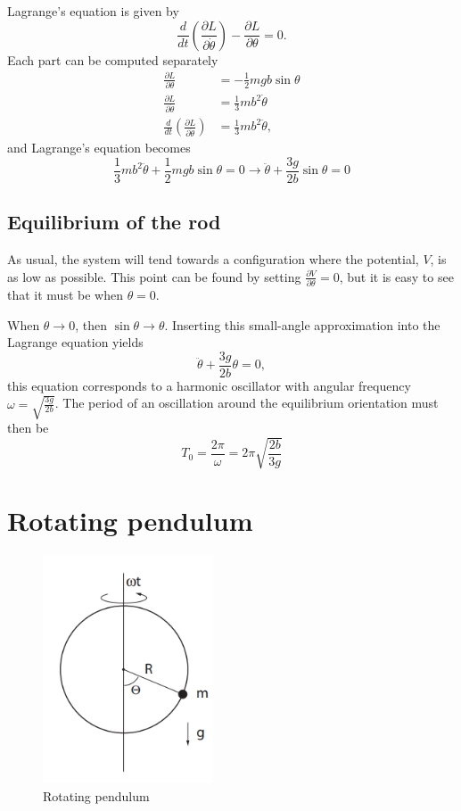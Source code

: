 \documentclass[11pt]{amsart}
\begin{document}
Lagrange's equation is given by
\begin{equation}
\label{eq:lagreqn}
\frac{d }{dt}\left(\frac{\partial L}{\partial \dot{\theta}} \right) - \frac{\partial L}{\partial \theta} = 0.
\end{equation}
Each part can be computed separately
\begin{align*}
\frac{\partial L}{\partial \theta} &= -\frac{1}{2} mgb \sin \theta \\
\frac{\partial L}{\partial \dot{\theta}} &= \frac{1}{3}mb^2\dot{\theta} \\
\frac{d }{dt}\left(\frac{\partial L}{\partial \dot{\theta}} \right) &= \frac{1}{3}mb^2 \ddot{\theta},
\end{align*}
and Lagrange's equation becomes
\begin{equation}
\frac{1}{3}mb^2\ddot{\theta} + \frac{1}{2}mgb \sin \theta = 0 \rightarrow 
\ddot{\theta} + \frac{3g}{2b}\sin \theta = 0
\end{equation}

\subsection{Equilibrium of the rod}
As usual, the system will tend towards a configuration where the potential, $V$, is as low as possible.  This point can be found by setting $\frac{\partial V}{\partial \theta} = 0$, but it is easy to see that it must be when $\theta = 0$.

When $\theta \to 0$, then $\sin \theta \to \theta$. Inserting this small-angle approximation into the Lagrange equation yields
\begin{equation}
\label{eq:lagapprox}
\ddot{\theta} + \frac{3g}{2b}\theta = 0,
\end{equation}
this equation corresponds to a harmonic oscillator with angular frequency $\omega = \sqrt{\frac{3g}{2b}}$. The period of an oscillation around the equilibrium orientation must then be
\begin{equation}
\label{eq:HOperiod}
T_0 = \frac{2\pi}{\omega} = 2\pi \sqrt{\frac{2b}{3g}}
\end{equation}

\section{Rotating pendulum}

\begin{figure}
\centering
	\includegraphics[width = 0.45\textwidth]{rotating_pendulum.png}
	\caption{Rotating pendulum}
	\label{fig:rotating_pendulum}
\end{figure}
\end{document}

